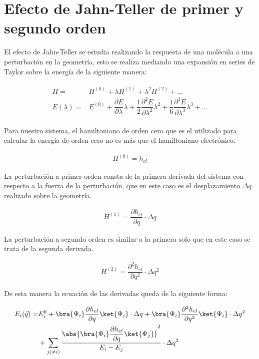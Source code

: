 \documentclass[12pt]{report}
\begin{document}
\section{Efecto de Jahn-Teller de primer y segundo orden}

El efecto de Jahn-Teller se estudia realizando la respuesta de una molécula a una perturbación en la geometría, esto se realiza mediando una expansión en series de Taylor sobre la energía de la siguiente manera:


\begin{ceqn}
\begin{align}
\begin{split}
H=&H^{(0)}+\lambda H^{(1)} + \lambda^2 H^{(2)}+\dots \\
E(\lambda)=&E^{(0)}+\dfrac{\partial E}{\partial \lambda}\lambda+\dfrac{1}{2}\dfrac{\partial^2E}{\partial \lambda^2}\lambda^2+
\dfrac{1}{6}\dfrac{\partial^3E}{\partial \lambda^3}\lambda^3+\dots
\end{split}
\end{align}
\end{ceqn}



Para nuestro sistema, el hamiltoniano de orden cero que es el utilizado para calcular la energía de orden cero no es más que el hamiltoniano electrónico.

\begin{align}
H^{(0)}=h_{el}
\end{align}

La perturbación a primer orden consta de la primera derivada del sistema con respecto a la fuerza de la perturbación, que en este caso es el desplazamiento $\Delta q$ realizado sobre la geometría.

\begin{align}
H^{(1)}=\dfrac{\partial h_{el}}{\partial q} \cdot \Delta q
\end{align}

La perturbación a segundo orden es similar a la primera solo que en este caso se trata de la segunda derivada.

\begin{align}
H^{(2)}=\dfrac{\partial^2 h_{el}}{\partial q^2} \cdot \Delta q^2
\end{align}

\newpage
De esta manera la ecuación de las derivadas queda de la siguiente forma:
\\


\begin{ceqn}
\begin{align}
\begin{split}
E_i(\vec{q})= & E_i^0+\bra{\Psi_i}\dfrac{\partial h_{el}}{\partial q}\ket{\Psi_i}\cdot \Delta q +\bra{\Psi_i}\dfrac{\partial^2 h_{el}}{\partial q^2}\ket{\Psi_i}\cdot \Delta q^2\\
& + \sum	_{j(\neq i)} \dfrac{\abs{\bra{\Psi_i}\dfrac{\partial h_{el}}{\partial q}\ket{\Psi_j}}^2}{E_i-E_j}\cdot\Delta q^2
\end{split}
\end{align}
\end{ceqn}
\end{document}
